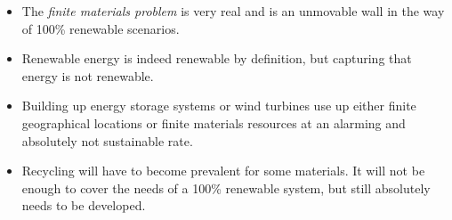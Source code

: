 \begin{kaoboxgreen}[frametitle=Main Takeaways]

\begin{itemize}
\item The \emph{finite materials problem} is very real and is an unmovable wall in the way of 100\% renewable scenarios.
\item Renewable energy is indeed renewable by definition, but capturing that energy is not renewable.
\item Building up energy storage systems or wind turbines use up either finite geographical locations or finite materials resources at an alarming and absolutely not sustainable rate.
\item Recycling will have to become prevalent for some materials. It will not be enough to cover the needs of a 100\% renewable system, but still absolutely needs to be developed.
\end{itemize}
  
\end{kaoboxgreen}